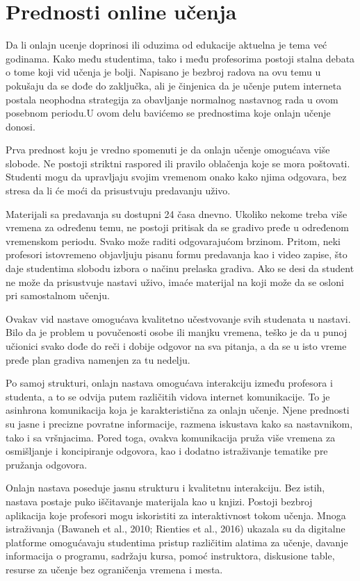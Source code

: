 \documentclass{article}
\begin{document}
\section{Prednosti online učenja}

Da li onlajn ucenje doprinosi ili oduzima od edukacije aktuelna je tema već godinama. Kako među studentima, tako i među profesorima postoji stalna debata o tome koji vid učenja je bolji. Napisano je bezbroj radova na ovu temu u pokušaju da se dođe do zaključka, ali je činjenica da je učenje putem interneta postala neophodna strategija za obavljanje normalnog nastavnog rada u ovom posebnom periodu.U ovom delu bavićemo se prednostima koje onlajn učenje donosi.

Prva prednost koju je vredno spomenuti je da onlajn učenje omogućava više slobode. Ne postoji striktni raspored ili pravilo oblačenja koje se mora poštovati. Studenti mogu da upravljaju svojim vremenom onako kako njima odgovara, bez stresa da li će moći da prisustvuju predavanju uživo.

Materijali sa predavanja su dostupni 24 časa dnevno. Ukoliko nekome treba više vremena za određenu temu, ne postoji pritisak da se gradivo pređe u određenom vremenskom periodu. Svako može raditi odgovarajućom brzinom. Pritom, neki profesori istovremeno objavljuju pisanu formu predavanja kao i video zapise, što daje studentima slobodu izbora o načinu prelaska gradiva. Ako se desi da student ne može da prisustvuje nastavi uživo, imaće materijal na koji može da se osloni pri samostalnom učenju.

Ovakav vid nastave omogućava kvalitetno učestvovanje svih studenata u nastavi. Bilo da je problem u povučenosti osobe ili manjku vremena, teško je da u punoj učionici svako dođe do reči i dobije odgovor na sva pitanja, a da se u isto vreme pređe plan gradiva namenjen za tu nedelju.

Po samoj strukturi, onlajn nastava omogućava interakciju između profesora i studenta, a to se odvija putem različitih vidova internet komunikacije. To je asinhrona komunikacija koja je karakteristična za onlajn učenje. Njene prednosti su jasne i precizne povratne informacije, razmena iskustava kako sa nastavnikom, tako i sa vršnjacima. Pored toga, ovakva komunikacija pruža više vremena za osmišljanje i koncipiranje odgovora, kao i dodatno istraživanje tematike pre pružanja odgovora.

Onlajn nastava poseduje jasnu strukturu i kvalitetnu interakciju. Bez istih, nastava postaje puko iščitavanje materijala kao u knjizi. Postoji bezbroj aplikacija koje profesori mogu iskoristiti za interaktivnost tokom učenja. Mnoga istraživanja (Bawaneh et al., 2010; Rienties et al., 2016) ukazala su da digitalne platforme omogućavaju studentima pristup različitim alatima za učenje, davanje informacija o programu, sadržaju kursa, pomoć instruktora, diskusione table, resurse za učenje bez ograničenja vremena i mesta.
\end{document}
